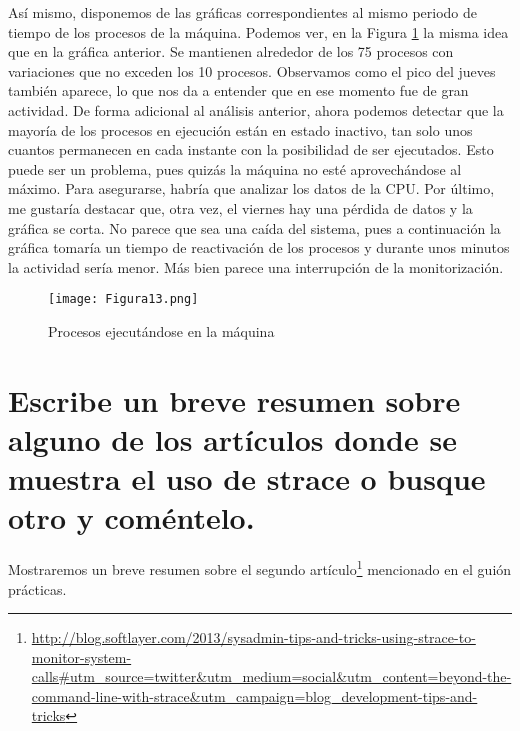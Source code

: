 Así mismo, disponemos de las gráficas correspondientes al mismo periodo de tiempo de los procesos de la máquina. Podemos ver, en la Figura \ref{fig:figura13}
la misma idea que en la gráfica anterior. Se mantienen alrededor de los 75 procesos con variaciones que no exceden los 10 procesos. Observamos como el pico del
jueves también aparece, lo que nos da a entender que en ese momento fue de gran actividad. De forma adicional al análisis anterior, ahora podemos detectar que
la mayoría de los procesos en ejecución están en estado inactivo, tan solo unos cuantos permanecen en cada instante con la posibilidad de ser ejecutados. Esto puede
ser un problema, pues quizás la máquina no esté aprovechándose al máximo. Para asegurarse, habría que analizar los datos de la CPU. Por último, me gustaría
destacar que, otra vez, el viernes hay una pérdida de datos y la gráfica se corta. No parece que sea una caída del sistema, pues a continuación la gráfica tomaría un 
tiempo de reactivación de los procesos y durante unos minutos la actividad sería menor. Más bien parece una interrupción de la monitorización.

\begin{figure}[H] 
\centering
\texttt{[image: Figura13.png]}  
\caption{Procesos ejecutándose en la máquina}\label{fig:figura13}
\end{figure}






\section{Escribe un breve resumen sobre alguno de los artículos donde se muestra el uso de strace o busque otro y coméntelo.}

Mostraremos un breve resumen sobre el segundo artículo\footnote{\url{http://blog.softlayer.com/2013/sysadmin-tips-and-tricks-using-strace-to-monitor-system-calls#utm_source=twitter&utm_medium=social&utm_content=beyond-the-command-line-with-strace&utm_campaign=blog_development-tips-and-tricks}} mencionado en el guión prácticas. 


